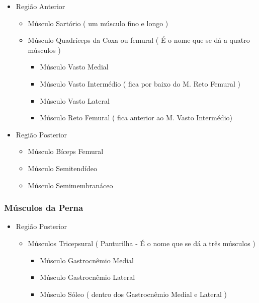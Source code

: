 \documentclass[
]{book}
\providecommand{\tightlist}{%
  \setlength{\itemsep}{0pt}\setlength{\parskip}{0pt}}
\begin{document}
\begin{itemize}
\tightlist
\item
  Região Anterior

  \begin{itemize}
  \tightlist
  \item
    Músculo Sartório ( um músculo fino e longo )
  \item
    Músculo Quadríceps da Coxa ou femural ( É o nome que se dá a quatro músculos )

    \begin{itemize}
    \tightlist
    \item
      Músculo Vasto Medial
    \item
      Músculo Vasto Intermédio ( fica por baixo do M. Reto Femural )
    \item
      Músculo Vasto Lateral
    \item
      Músculo Reto Femural ( fica anterior ao M. Vasto Intermédio)
    \end{itemize}
  \end{itemize}
\item
  Região Posterior

  \begin{itemize}
  \tightlist
  \item
    Músculo Bíceps Femural
  \item
    Músculo Semitendídeo
  \item
    Músculo Semimembranáceo
  \end{itemize}
\end{itemize}

\hypertarget{muxfasculos-da-perna}{%
\subsubsection{Músculos da Perna}\label{muxfasculos-da-perna}}

\begin{itemize}
\tightlist
\item
  Região Posterior

  \begin{itemize}
  \tightlist
  \item
    Músculos Tricepsural ( Panturilha - É o nome que se dá a três músculos )

    \begin{itemize}
    \tightlist
    \item
      Músculo Gastrocnêmio Medial
    \item
      Músculo Gastrocnêmio Lateral
    \item
      Músculo Sóleo ( dentro dos Gastrocnêmio Medial e Lateral )
    \end{itemize}
  \end{itemize}
\end{itemize}
\end{document}
